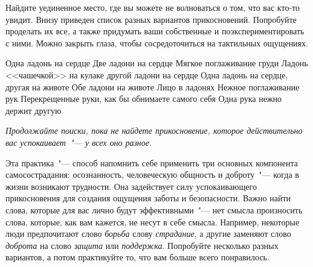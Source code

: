 Найдите уединенное место, где вы можете не волноваться о том, что вас кто-то увидит. Внизу приведен список разных вариантов прикосновений. Попробуйте проделать их все, а также придумать ваши собственные и поэкспериментировать с ними. Можно закрыть глаза, чтобы сосредоточиться на тактильных ощущениях. 

\begin{itemize}
	\itemheart Одна ладонь на сердце
	\itemheart Две ладони на сердце
	\itemheart Мягкое поглаживание груди
	\itemheart Ладонь <<чашечкой>> на кулаке другой ладони на сердце
	\itemheart Одна ладонь на сердце, другая на животе
	\itemheart Обе ладони на животе 
	\itemheart Лицо в ладонях
	\itemheart Нежное поглаживание рук
	\itemheart Перекрещенные руки, как бы обнимаете самого себя 
	\itemheart Одна рука нежно держит другую
\end{itemize}

\textit{Продолжайте поиски, пока не найдете прикосновение, которое действительно вас успокаивает~"--- у всех оно разное.}


\label{IP:Self-Compassion_Break}

Эта практика~"--- способ напомнить себе применить три основных компонента самосострадания: осознанность, человеческую общность и доброту~"--- когда в жизни возникают трудности. Она задействует силу успокаивающего прикосновения для создания ощущения заботы и безопасности. Важно найти слова, которые для вас лично будут эффективными~"--- нет смысла произносить слова, которые, как вам кажется, не несут в себе смысла. Например, некоторые люди предпочитают слово \textit{борьба} слову \textit{страдание}, а другие заменяют слово \textit{доброта} на слово \textit{защита} или \textit{поддержка}. Попробуйте несколько разных вариантов, а потом практикуйте то, что вам больше всего понравилось. 

